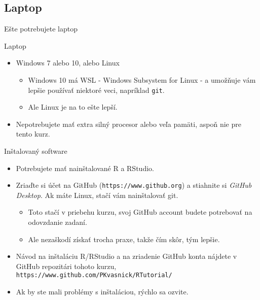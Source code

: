\subsection{Laptop}
\begin{frame}{Ešte potrebujete laptop}
	\begin{block}{Laptop}
		\begin{itemize}
			\item Windows 7 alebo 10, alebo Linux
			\begin{itemize}
				\item Windows 10 má WSL - Windows Subsystem for Linux - a umožňuje vám lepšie používať niektoré veci, napríklad \texttt{git}.
				\item Ale Linux je na to ešte lepší.
			\end{itemize}
			\item Nepotrebujete mať extra silný procesor alebo veľa pamäti, aspoň nie pre tento kurz.
		\end{itemize}
	\end{block}
	\begin{block}{Inštalovaný software}
		\begin{itemize}
			\item Potrebujete mať nainštalované R a RStudio.
			\item Zriaďte si účet na GitHub (\texttt{https://www.github.org}) a stiahnite si \emph{GitHub Desktop}. Ak máte Linux, stačí vám nainštalovať git. 
			\begin{itemize}
				\item Toto stačí v priebehu kurzu, svoj GitHub account budete potrebovať na odovzdanie zadaní.
				\item Ale nezaškodí získať trocha praxe, takže čím skôr, tým lepšie.
			\end{itemize}
			\item Návod na inštaláciu R/RStudio a na zriadenie GitHub konta nájdete v GitHub repozitári tohoto kurzu, \texttt{https://www.github.com/PKvasnick/RTutorial/}
			\item Ak by ste mali problémy s inštaláciou, rýchlo sa ozvite.
		\end{itemize}
	\end{block}
\end{frame}

